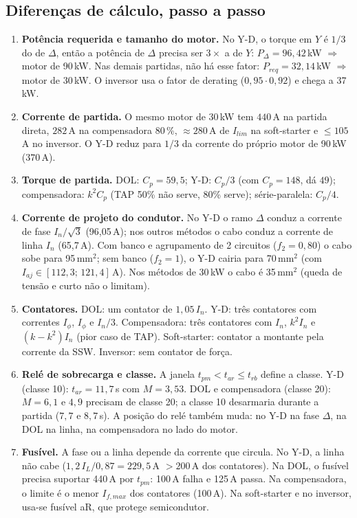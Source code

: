 \documentclass[11pt,a4paper]{article}
\begin{document}
\subsection{Diferen\c{c}as de c\'alculo, passo a passo}
\begin{enumerate}[leftmargin=1.4em]
\item \textbf{Pot\^encia requerida e tamanho do motor.} No Y-D, o torque em $Y$ \'e $1/3$ do de $\Delta$, ent\~ao a pot\^encia de $\Delta$ precisa ser $3\times$ a de $Y$: $P_\Delta = 96{,}42$\,kW $\Rightarrow$ motor de 90\,kW. Nas demais partidas, n\~ao h\'a esse fator: $P_{req}=32{,}14$\,kW $\Rightarrow$ motor de 30\,kW. O inversor usa o fator de derating ($0{,}95\cdot 0{,}92$) e chega a 37\,kW.
\item \textbf{Corrente de partida.} O mesmo motor de 30\,kW tem $440$\,A na partida direta, $282$\,A na compensadora 80\,\%, $\approx 280$\,A de $I_{lim}$ na soft-starter e $\le 105$\,A no inversor. O Y-D reduz para $1/3$ da corrente do pr\'oprio motor de 90\,kW ($370$\,A).
\item \textbf{Torque de partida.} DOL: $C_p=59{,}5$; Y-D: $C_p/3$ (com $C_p=148$, d\'a $49$); compensadora: $k^2 C_p$ (TAP 50\% n\~ao serve, 80\% serve); s\'erie-paralela: $C_p/4$.
\item \textbf{Corrente de projeto do condutor.} No Y-D o ramo $\Delta$ conduz a corrente de fase $I_n/\sqrt{3}$ (96,05\,A); nos outros m\'etodos o cabo conduz a corrente de linha $I_n$ (65,7\,A). Com banco e agrupamento de 2 circuitos ($f_2=0{,}80$) o cabo sobe para 95\,mm$^2$; sem banco ($f_2=1$), o Y-D cairia para 70\,mm$^2$ (com $I_{aj}\in[112{,}3;\,121{,}4]$\,A). Nos m\'etodos de 30\,kW o cabo \'e 35\,mm$^2$ (queda de tens\~ao e curto n\~ao o limitam).
\item \textbf{Contatores.} DOL: um contator de $1{,}05\,I_n$. Y-D: tr\^es contatores com correntes $I_\phi$, $I_\phi$ e $I_n/3$. Compensadora: tr\^es contatores com $I_n$, $k^2I_n$ e $(k-k^2)I_n$ (pior caso de TAP). Soft-starter: contator a montante pela corrente da SSW. Inversor: sem contator de for\c{c}a.
\item \textbf{Rel\'e de sobrecarga e classe.} A janela $t_{pm}<t_{ar}\le t_{rb}$ define a classe. Y-D (classe 10): $t_{ar}=11{,}7$\,s com $M=3{,}53$. DOL e compensadora (classe 20): $M=6{,}1$ e $4{,}9$ precisam de classe 20; a classe 10 desarmaria durante a partida ($7{,}7$ e $8{,}7$\,s). A posi\c{c}\~ao do rel\'e tamb\'em muda: no Y-D na fase $\Delta$, na DOL na linha, na compensadora no lado do motor.
\item \textbf{Fus\'ivel.} A fase ou a linha depende da corrente que circula. No Y-D, a linha n\~ao cabe ($1{,}2\,I_L/0{,}87=229{,}5$\,A $>200$\,A dos contatores). Na DOL, o fus\'ivel precisa suportar 440\,A por $t_{pm}$: 100\,A falha e 125\,A passa. Na compensadora, o limite \'e o menor $I_{f,max}$ dos contatores (100\,A). Na soft-starter e no inversor, usa-se fus\'ivel aR, que protege semicondutor.

\end{enumerate}
\end{document}
